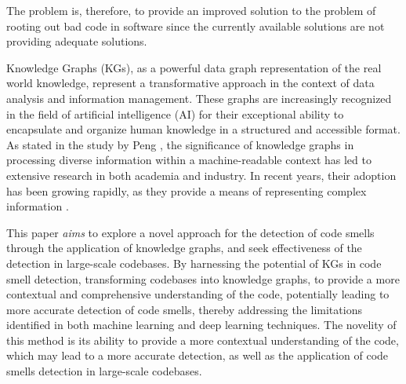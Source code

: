 
The problem is, therefore, to provide an improved solution to the problem of rooting out bad code in software since the currently available solutions are not providing adequate solutions.

Knowledge Graphs (KGs), as a powerful data graph representation of the real world knowledge, represent a transformative approach in the context of data analysis and information management. These graphs are increasingly recognized in the field of artificial intelligence (AI) for their exceptional ability to encapsulate and organize human knowledge in a structured and accessible format. As stated in the study by Peng \etal\cite{Peng_Xia_Naseriparsa_Osborne_2023}, the significance of knowledge graphs in processing diverse information within a machine-readable context has led to extensive research in both academia and industry. In recent years, their adoption has been growing rapidly, as they provide a means of representing complex information  \cite{Peng_Xia_Naseriparsa_Osborne_2023}. 




This paper \textit{aims} to explore a novel approach for the detection of code smells through the application of knowledge graphs, and seek effectiveness of the detection in large-scale codebases. By harnessing the potential of KGs in code smell detection, transforming codebases into knowledge graphs, to provide a more contextual and comprehensive understanding of the code, potentially leading to more accurate detection of code smells, thereby addressing the limitations identified in both machine learning and deep learning techniques. The novelity of this method is its ability to provide a more contextual understanding of the code, which may lead to a more accurate detection, as well as the application of code smells detection in large-scale codebases. 




